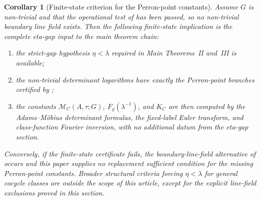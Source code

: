\documentclass[11pt,a4paper]{amsart}
\theoremstyle{plain}
\newtheorem{corollary}[theorem]{Corollary}
\theoremstyle{definition}
\theoremstyle{remark}
\begin{document}
\begin{corollary}[Finite-state criterion for the Perron-point constants]
  \label{thm:eta-gap-diagnostic-interface}
  Assume \(G\) is non-trivial and that the operational test of
   has been passed, so no
  non-trivial boundary line field exists.  Then the following finite-state
  implication is the complete eta-gap input to the main theorem chain:
  \begin{enumerate}[label=\textup{(\roman*)},leftmargin=*]
    \item the strict-gap hypothesis \(\eta<\lambda\) required in Main
      Theorems~II and~III is available;
    \item the non-trivial determinant logarithms have exactly the
      Perron-point branches certified by
      ;
    \item the constants \(\mathcal M_C(A,\tau;G)\),
      \(F_\varrho(\lambda^{-1})\), and \(K_C\) are then computed by the
      Adams--M\"obius determinant formulas, the fixed-label Euler transform,
      and class-function Fourier inversion, with no additional datum from the
      eta-gap section.
  \end{enumerate}
  Conversely, if the finite-state certificate fails, the boundary-line-field
  alternative of  occurs and this paper supplies no
  replacement sufficient condition for the missing Perron-point constants.
  Broader structural criteria forcing \(\eta<\lambda\) for general cocycle
  classes are outside the scope of this article, except for the explicit
  line-field exclusions proved in this section.
\end{corollary}
\end{document}
